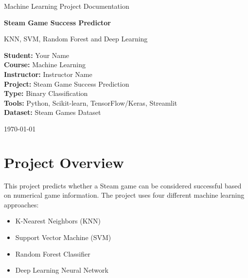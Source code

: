 \documentclass[12pt,a4paper]{article}
\begin{document}
\begin{titlepage}
    \centering
    \vspace*{2cm}

    {\Large Machine Learning Project Documentation\par}
    \vspace{1.5cm}

    {\Huge\bfseries Steam Game Success Predictor\par}
    \vspace{0.5cm}

    {\Large KNN, SVM, Random Forest and Deep Learning\par}

    \vfill

    \begin{flushleft}
    \textbf{Student:} Your Name \\
    \textbf{Course:} Machine Learning \\
    \textbf{Instructor:} Instructor Name \\
    \textbf{Project:} Steam Game Success Prediction \\
    \textbf{Type:} Binary Classification \\
    \textbf{Tools:} Python, Scikit-learn, TensorFlow/Keras, Streamlit \\
    \textbf{Dataset:} Steam Games Dataset
    \end{flushleft}

    \vfill

    {\large \today\par}
\end{titlepage}

\tableofcontents
\newpage

\section{Project Overview}

This project predicts whether a Steam game can be considered successful based on numerical game information. The project uses four different machine learning approaches:

\begin{itemize}[noitemsep]
    \item K-Nearest Neighbors (KNN)
    \item Support Vector Machine (SVM)
    \item Random Forest Classifier
    \item Deep Learning Neural Network
\end{itemize}
\end{document}
